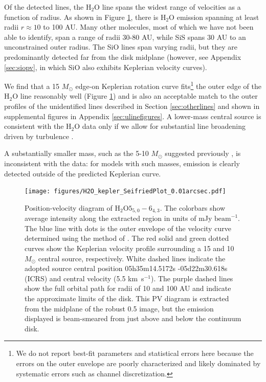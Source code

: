 \documentclass[twocolumn]{aastex61}
\newcommand{\msun}{\ensuremath{M_{\odot}}\xspace}			%
\newcommand{\water}{H$_{2}$O\xspace}		%
\newcommand{\kms}{\textrm{km~s}\ensuremath{^{-1}}\xspace}	%
\newcommand{\perbeam}{\ensuremath{\textrm{beam}^{-1}}\xspace}
\begin{document}
Of the detected lines, the \water line spans the widest range of
velocities as a function of radius.  As shown in Figure \ref{fig:h2okepler},
there is \water emission spanning at least radii $r\approx 10$ to 100 AU.  Many
other molecules, most of
which we have not been able to identify, span a range of radii 30-80 AU, while SiS
spans 30 AU to an unconstrained outer radius.   The SiO lines span varying radii,
but they are predominantly detected far from the disk midplane (however,
see Appendix \ref{sec:siopv}, in which SiO also exhibits Keplerian velocity
curves).

We find that a 15 \msun edge-on Keplerian rotation curve fits\footnote{We do
not report best-fit parameters and statistical errors here because the errors
on the outer envelope are poorly characterized and likely dominated by
systematic errors such as channel discretization.  } the outer edge of
the \water line reasonably well (Figure \ref{fig:h2okepler}) and is also an
acceptable match to the outer profiles of the unidentified lines
described in Section \ref{sec:otherlines} and shown in supplemental figures in
Appendix \ref{sec:ulinefigures}.  A lower-mass central source is consistent
with the \water data only if we allow for substantial line broadening driven
by turbulence \citep[but
see][who observe stringent upper limits on turbulence in lower-mass
disks]{Flaherty2017a}. 


A substantially smaller mass, such as the 5-10 \msun suggested previously
\citep{Plambeck2016a,Hirota2014a}, is inconsistent with the data: for models
with such masses, emission is clearly detected outside of the predicted
Keplerian curve.  


\begin{figure}[!htp]
\texttt{[image: figures/H2O\_kepler\_SeifriedPlot\_0.01arcsec.pdf]}
\caption{Position-velocity diagram of \water $5_{5,0}-6_{4,3}$.
The colorbars show average intensity along the extracted region in units
of mJy \perbeam.
The blue line with dots is the outer envelope of the velocity curve
determined using the method of \citet{Seifried2016a}.
The red solid and green dotted curves show the Keplerian velocity profile
surrounding a 15 and 10 \msun central source, respectively.
White dashed lines indicate the adopted source central position
05h35m14.5172s -05d22m30.618s (ICRS)
and central velocity (5.5 \kms).
The purple dashed lines show the full orbital path for radii of
10 and 100 AU and indicate the approximate limits of the disk.
This PV diagram is extracted from the midplane of the robust 0.5 image,
but the emission displayed is beam-smeared from just above and below the
continuum disk.
}
\label{fig:h2okepler}
\end{figure}
\end{document}
